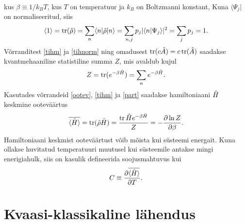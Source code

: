 \documentclass{trkut}%
\DeclareMathOperator{\tr}{tr}
\renewcommand\bra[1]{{\langle{#1}|}}
\renewcommand\braket[1]{\langle{#1}\rangle}
\begin{document}
kus $\beta \equiv 1/k_B T$, kus $T$ on temperatuur ja $k_B$ on Boltzmanni konstant,
Kuna $\bra{\Psi_j}$ on normaliseeritud, siis
\begin{equation}
    \braket{1}=\tr(\op{\rho})=\sum_n \braket{n|\op{\rho}|n}=\sum_{n, j} p_j |\braket{n| \Psi_j}|^2=\sum_j p_j=1.
    \label{tihnorm}
\end{equation}
Võrranditest \eqref{tihm} ja \eqref{tihnorm} ning omadusest $\tr(c\op{A})=c\tr(\op{A})$ saadakse kvantmehaaniline statistiline summa $Z$, mis avaldub kujul
\begin{equation}
    Z=\tr(e^{-\beta \op{H}})=\sum_n e^{-\beta \op{H}}.
    \label{part}
\end{equation}
Kasutades võrrandeid \eqref{ootev}, \eqref{tihm} ja \eqref{part} saadakse hamiltoniaani $\op{H}$ keskmine ooteväärtus
\begin{equation}
    \overline{\braket{\op{H}}}=\tr(\op{\rho}\op{H})=\frac{\tr{\op{H}e^{-\beta \op{H}}}}{Z}= -\frac{\partial \ln Z}{\partial \beta}.
\end{equation}
Hamiltoniaani keskmist ooteväärtust võib mõista kui süsteemi energait. Kuna ollakse huvitatud temperatuuri muutusel kui süsteemile antakse mingi enerigiahulk, siis on kasulik defineerida soojusmahtuvus kui
\begin{equation}
    C \equiv \frac{\partial \overline{\braket{\op{H}}}}{\partial T}.
\end{equation}

\section{Kvaasi-klassikaline lähendus}
\end{document}
